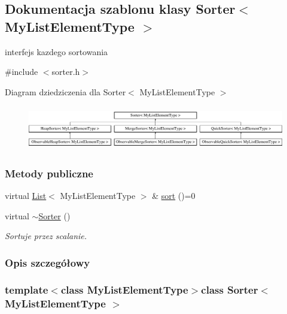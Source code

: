 \hypertarget{class_sorter}{\subsection{Dokumentacja szablonu klasy Sorter$<$ My\-List\-Element\-Type $>$}
\label{class_sorter}
}


interfejs kazdego sortowania  




{\ttfamily \#include $<$sorter.\-h$>$}

Diagram dziedziczenia dla Sorter$<$ My\-List\-Element\-Type $>$\begin{figure}[H]
\begin{center}
\leavevmode
\includegraphics[height=1.924399cm]{class_sorter}
\end{center}
\end{figure}
\subsubsection*{Metody publiczne}
\begin{DoxyCompactItemize}
\item 
virtual \hyperlink{class_list}{List}$<$ My\-List\-Element\-Type $>$ \& \hyperlink{class_sorter_a4a82d8151d6172802d1e60cb30c7d7d3}{sort} ()=0
\item 
virtual \hyperlink{class_sorter_ac71eebbce06b3fa6a3280c5733d999a5}{$\sim$\-Sorter} ()
\begin{DoxyCompactList}\small\item\em Sortuje przez scalanie. \end{DoxyCompactList}\end{DoxyCompactItemize}


\subsubsection{Opis szczegółowy}
\subsubsection*{template$<$class My\-List\-Element\-Type$>$class Sorter$<$ My\-List\-Element\-Type $>$}



